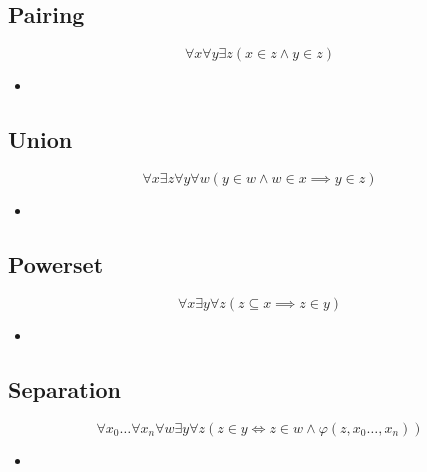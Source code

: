\subsection{Pairing}
\begin{equation*}
\forall x \forall y \exists z (x \in z \land y \in z)
\end{equation*}

\begin{itemize}
	
	\item 
	
\end{itemize}

\subsection{Union}
\begin{equation*}
\forall x \exists z \forall y \forall w (y \in w \land w \in x \implies y \in z)
\end{equation*}


\begin{itemize}
	
	\item 
	
\end{itemize}

\subsection{Powerset}
\begin{equation*}
\forall x \exists y \forall z (z \subseteq x \implies z \in y)
\end{equation*}

\begin{itemize}
	
	\item 
	
\end{itemize}

\subsection{Separation}
\begin{equation*}
\forall x_0 \dots \forall x_n \forall w \exists y \forall z (z \in y \iff z \in w \land \varphi (z, x_0 \dots, x_n))
\end{equation*}

\begin{itemize}
	
	\item 
	
\end{itemize}

